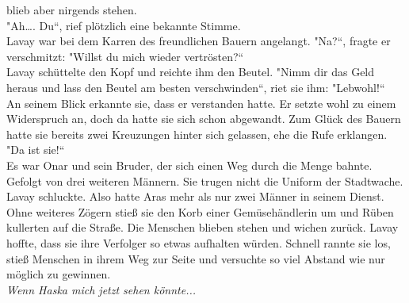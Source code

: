 blieb aber nirgends stehen.\\
"Ah…. Du``, rief plötzlich eine bekannte Stimme.\\
Lavay war bei dem Karren des freundlichen Bauern angelangt. "Na?``, fragte er verschmitzt: "Willst 
du mich wieder vertrösten?``\\
Lavay schüttelte den Kopf und reichte ihm den Beutel. "Nimm dir das Geld heraus und lass den Beutel 
am besten verschwinden``, riet sie ihm: "Lebwohl!``\\
An seinem Blick erkannte sie, dass er verstanden hatte. Er setzte wohl zu einem Widerspruch an, 
doch da hatte sie sich schon abgewandt. Zum Glück des Bauern hatte sie bereits zwei Kreuzungen 
hinter sich gelassen, ehe die Rufe erklangen.\\
"Da ist sie!``\\
Es war Onar und sein Bruder, der sich einen Weg durch die Menge bahnte. Gefolgt von drei weiteren 
Männern. Sie trugen nicht die Uniform der Stadtwache. Lavay schluckte. Also hatte Aras mehr als nur 
zwei Männer in seinem Dienst. Ohne weiteres Zögern stieß sie den Korb einer Gemüsehändlerin um und 
Rüben kullerten auf die Straße. Die Menschen blieben stehen und wichen zurück. Lavay hoffte, dass 
sie ihre Verfolger so etwas aufhalten würden. Schnell rannte sie los, stieß Menschen in ihrem Weg 
zur Seite und versuchte so viel Abstand wie nur möglich zu gewinnen.\\
\textit{Wenn Haska mich jetzt sehen könnte...}\\
